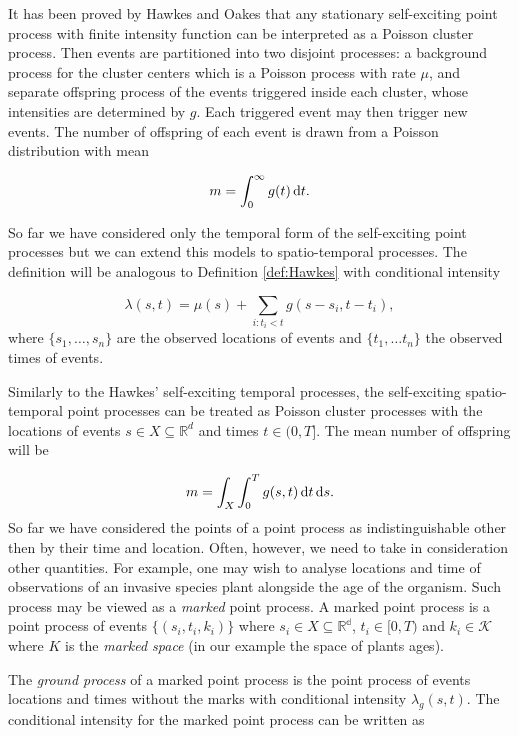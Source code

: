 It has been proved by Hawkes and Oakes \cite{Hawkes74} that any stationary self-exciting point process with finite intensity function can be interpreted as a Poisson cluster process. Then events are partitioned into two disjoint processes: a background process for the cluster centers which is a Poisson process with rate $\mu$, and separate offspring process of the events triggered inside each cluster, whose intensities are determined by $g$. Each triggered event may then trigger new events. The number of offspring of each event is drawn from a Poisson distribution with mean 

\begin{equation*}
    m = \int_0^\infty g(t) \operatorname{d}\!{t}.
\end{equation*}

So far we have considered only the temporal form of the self-exciting point processes but we can extend this models to spatio-temporal processes. The definition will be analogous to Definition \ref{def:Hawkes} with conditional intensity

\begin{equation*}
    \lambda(s, t) = \mu(s) + \sum_{i:t_i<t} g(s - s_i, t - t_i),
\end{equation*}
where $\{ s_1, \dots, s_n \}$ are the observed locations of events and $\{t_1, \dots t_n \}$ the observed times of events. 

Similarly to the Hawkes' self-exciting temporal processes, the self-exciting spatio-temporal point processes can be treated as Poisson cluster processes with the locations of events $s \in X \subseteq \mathbb{R}^d$ and times $t \in (0, T]$. The mean number of offspring will be

\begin{equation}\label{eq:meanoffsp}
    m = \int_X \int_0^T g(s, t) \operatorname{d}\!{t} \operatorname{d}\!{s}.
\end{equation}
So far we have considered the points of a point process as indistinguishable other then by their time and location. Often, however, we need to take in consideration other quantities. For example, one may wish to analyse locations and time of observations of an invasive species plant alongside the age of the organism. Such process may be viewed as a \textit{marked} point process. A marked point process is a point process of events $\{ (s_i, t_i, k_i ) \}$ where  $s_i \in X \subseteq \mathbb{R^d}$, $t_i \in [0, T)$ and $k_i \in \mathcal{K}$ where $K$ is the \textit{marked space} (in our example the space of plants ages).

The \textit{ground process} of a marked point process is the point process of events locations and times without the marks with conditional intensity $\lambda_g(s, t)$. The conditional intensity for the marked point process can be written as

